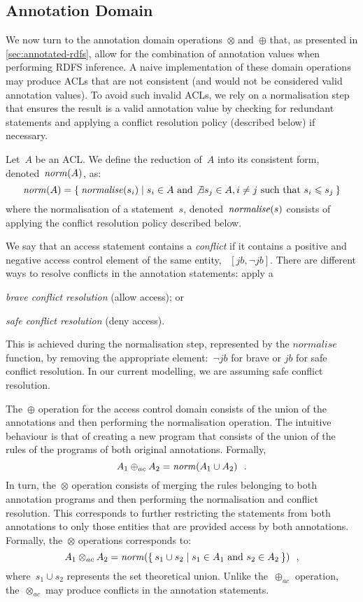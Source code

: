 \subsection{Annotation Domain}
\label{sec:access-contr-annot}
%
We now turn to the annotation domain operations~$\otimes$ and~$\oplus$ that, as presented in \cref{sec:annotated-rdfs},
allow for the combination of annotation values when performing \ac{RDFS} inference.
%
A naive implementation of these domain operations may produce \acp{ACL} that are not consistent (and would not be
considered valid annotation values).  To avoid such invalid \acp{ACL}, we rely on a normalisation step that ensures the
result is a valid annotation value by checking for redundant statements and applying a conflict resolution policy
(described below) if necessary.
%
\begin{definition}[Normalise]
  Let~$A$ be an \ac{ACL}. We define the reduction of~$A$ into its consistent form, denoted~$\mathit{norm}\!\left(A\right)$, as:
  \[
  \mathit{norm}\!\left(A\right) = \left\{\: \mathit{normalise}\!\left(s_{i}\right) \mid s_{i} \in A \mbox{ and } {\not{\exists}} s_{j} \in A, i \neq j \mbox{ such that } s_{i} \leqslant
  s_{j}\:\right\}
  \]
  where the normalisation of a statement~$s$, denoted~$\mathit{normalise}\!\left(s\right)$ consists of applying the conflict resolution policy
  described below.
\end{definition}
%
We say that an access statement contains a \emph{conflict} if it contains a positive and negative access control element
of the same entity, \eg~$[jb, \neg jb]$.
%
There are different ways to resolve conflicts in the annotation statements: apply a
\begin{inparaenum}[(i)]
\item \emph{brave conflict resolution} (allow access); or
\item \emph{safe conflict resolution} (deny access).
\end{inparaenum}
%
This is achieved during the normalisation step, represented by the $normalise$ function, by removing the appropriate
element:~$\neg jb$ for brave or $jb$ for safe conflict resolution.  In our current modelling, we are assuming safe
conflict resolution.


The~$\oplus$ operation for the access control domain consists of the union of the annotations and then performing the
normalisation operation.  The intuitive behaviour is that of creating a new \nrdn program that consists of the union of
the rules of the programs of both original annotations. Formally,
\[
A_{1} \oplus_{ac} A_{2} = \mathit{norm}\!\left(A_{1} \cup A_{2} \right) \enspace .
\]
%
In turn, the~$\otimes$ operation consists of merging the rules belonging to both annotation programs and then performing
the normalisation and conflict resolution.
%
This corresponds to further restricting the statements from both annotations to only those entities that are provided access
by both annotations. Formally, the~$\otimes$ operations corresponds to:
\[
A_{1} \otimes_{ac} A_{2} = \mathit{norm}\!\left(\left\{\: s_{1} \cup s_{2} \mid s_{1} \in A_{1} \mbox{ and } s_{2} \in A_{2}\:\right\}\right)
\enspace,
\]
%
where~$s_1 \cup s_2$ represents the set theoretical union.
%
Unlike the~$\oplus_{ac}$ operation, the~$\otimes_{ac}$ may produce conflicts in the annotation statements.

